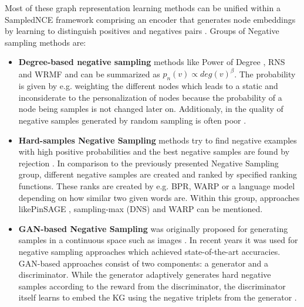 Most of these graph representation learning methods can be unified within a \ac{SampledNCE} framework comprising an encoder that generates node embeddings by learning to distinguish positives and negatives pairs \cite{MCNS}.
Groups of Negative sampling methods are:
\begin{itemize}
    \item 
    \textbf{Degree-based negative sampling} methods like Power of Degree \cite{MikolovSCCD13}, \ac{RNS}\cite{Dupre2018Word2vec} and \ac{WRMF} \cite{Hu2008Collaborative} and can be summarized as $p_n(v) \propto deg(v)^\beta$.
    The probability is given by e.g. weighting the different nodes which leads to a 
    static and inconsiderate to the personalization of nodes \cite{MCNS} because the probability of a node being samples is not changed later on.
    Additionaly, in the quality of negative samples generated by random sampling is  often poor \cite{cai2017kbgan}.
    
    \item 
    \textbf{Hard-samples Negative Sampling} methods try to find negative examples with high positive probabilities and the best negative samples are found by rejection \cite{MCNS}. 
    In comparison to the previously presented Negative Sampling group, 
    different negative samples are created and ranked by specified ranking functions.
    These ranks are created by e.g. \ac{BPR}, \ac{WARP} or a language model depending on how similar two given words are. 
    Within this group, approaches like\ac{PinSAGE} \cite{PinSAGE}, sampling-max (\ac{DNS}) \cite{DNS} and \ac{WARP} \cite{WARP} can be mentioned.
    
    \item 
    \textbf{\ac{GAN}-based Negative Sampling} was originally proposed for
    generating samples in a continuous space such as images \cite{cai2017kbgan}.
    In recent years it was used for negative sampling approaches which achieved state-of-the-art accuracies. 
    \ac{GAN}-based approaches consist of two components:
    a generator and a discriminator. 
    While the generator adaptively generates hard negative samples according to the reward from the discriminator, the discriminator itself learns to embed the \ac{KG} using the negative triplets from the generator \cite{wang2018incorporating}.
    
    
\end{itemize}

